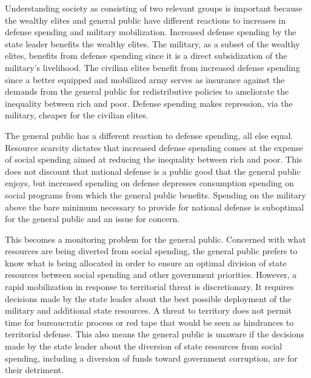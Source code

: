 \documentclass[11pt,]{article}
\begin{document}
Understanding society as consisting of two relevant groups is important
because the wealthy elites and general public have different reactions
to increases in defense spending and military mobilization. Increased
defense spending by the state leader benefits the wealthy elites. The
military, as a subset of the wealthy elites, benefits from defense
spending since it is a direct subsidization of the military's
livelihood. The civilian elites benefit from increased defense spending
since a better equipped and mobilized army serves as insurance against
the demands from the general public for redistributive policies to
ameliorate the inequality between rich and poor. Defense spending makes
repression, via the military, cheaper for the civilian elites.

The general public has a different reaction to defense spending, all
else equal. Resource scarcity dictates that increased defense spending
comes at the expense of social spending aimed at reducing the inequality
between rich and poor. This does not discount that national defense is a
public good that the general public enjoys, but increased spending on
defense depresses consumption spending on social programs from which the
general public benefits. Spending on the military above the bare minimum
necessary to provide for national defense is suboptimal for the general
public and an issue for concern.

This becomes a monitoring problem for the general public. Concerned with
what resources are being diverted from social spending, the general
public prefers to know what is being allocated in order to ensure an
optimal division of state resources between social spending and other
government priorities. However, a rapid mobilization in response to
territorial threat is discretionary. It requires decisions made by the
state leader about the best possible deployment of the military and
additional state resources. A threat to territory does not permit time
for bureaucratic process or red tape that would be seen as hindrances to
territorial defense. This also means the general public is unaware if
the decisions made by the state leader about the diversion of state
resources from social spending, including a diversion of funds toward
government corruption, are for their detriment.
\end{document}
